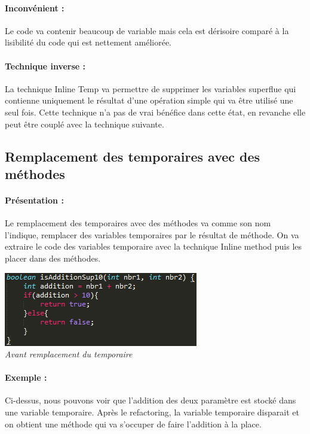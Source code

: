 \documentclass[a4paper,twoside,12pt,openright]{report}
\begin{document}
\paragraph{Inconvénient :}
Le code va contenir beaucoup de variable mais cela est dérisoire comparé à la lisibilité du code qui est nettement améliorée.

\paragraph{Technique inverse :}
La technique Inline Temp va permettre de supprimer les variables superflue qui contienne uniquement le résultat d'une opération simple qui va être utilisé une seul fois. Cette technique n'a pas de vrai bénéfice dans cette état, en revanche elle peut être couplé avec la technique suivante.\\

\subsection{Remplacement des temporaires avec des méthodes}
\paragraph{Présentation :}
Le remplacement des temporaires avec des méthodes va comme son nom l'indique, remplacer des variables temporaires par le résultat de méthode. On va extraire le code des variables temporaire avec la technique Inline method puis les placer dans des méthodes.

\begin{center}
\includegraphics[scale=1]{Image/Remplacement_Temp_Methode.png}\\
\itshape{Avant remplacement du temporaire}
\end{center}

\paragraph{Exemple :}
Ci-dessus, nous pouvons voir que l'addition des deux paramètre est stocké dans une variable temporaire. Après le refactoring, la variable temporaire disparait et on obtient une méthode qui va s'occuper de faire l'addition à la place.
\end{document}
